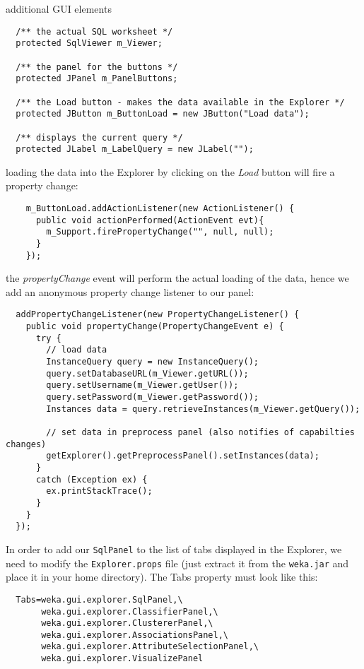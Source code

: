 \begin{tight_itemize}
  \newpage
  \item additional GUI elements
  \begin{verbatim}
  /** the actual SQL worksheet */
  protected SqlViewer m_Viewer;

  /** the panel for the buttons */
  protected JPanel m_PanelButtons;

  /** the Load button - makes the data available in the Explorer */
  protected JButton m_ButtonLoad = new JButton("Load data");

  /** displays the current query */
  protected JLabel m_LabelQuery = new JLabel("");
  \end{verbatim}

  \item loading the data into the Explorer by clicking on the \textit{Load}
button will fire a property change:
  \begin{verbatim}
    m_ButtonLoad.addActionListener(new ActionListener() {
      public void actionPerformed(ActionEvent evt){
        m_Support.firePropertyChange("", null, null);
      }
    });
  \end{verbatim}

  \item the \textit{propertyChange} event will perform the actual loading of the
data, hence we add an anonymous property change listener to our panel:
  \begin{verbatim}
  addPropertyChangeListener(new PropertyChangeListener() {
    public void propertyChange(PropertyChangeEvent e) {
      try {
        // load data
        InstanceQuery query = new InstanceQuery();
        query.setDatabaseURL(m_Viewer.getURL());
        query.setUsername(m_Viewer.getUser());
        query.setPassword(m_Viewer.getPassword());
        Instances data = query.retrieveInstances(m_Viewer.getQuery());

        // set data in preprocess panel (also notifies of capabilties changes)
        getExplorer().getPreprocessPanel().setInstances(data);
      }
      catch (Exception ex) {
        ex.printStackTrace();
      }
    }
  });
  \end{verbatim}

  \item In order to add our \texttt{SqlPanel} to the list of tabs displayed in
the Explorer, we need to modify the \texttt{Explorer.props} file (just extract
it from the \texttt{weka.jar} and place it in your home directory). The Tabs
property must look like this:
  \begin{verbatim}
  Tabs=weka.gui.explorer.SqlPanel,\
       weka.gui.explorer.ClassifierPanel,\
       weka.gui.explorer.ClustererPanel,\
       weka.gui.explorer.AssociationsPanel,\
       weka.gui.explorer.AttributeSelectionPanel,\
       weka.gui.explorer.VisualizePanel
  \end{verbatim}
\end{tight_itemize}

